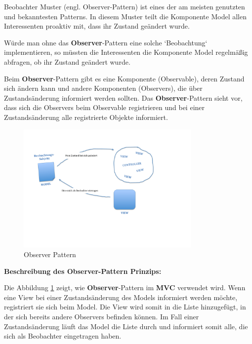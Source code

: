 Beobachter Muster (engl. Observer-Pattern) ist eines der am meisten genutzten und bekanntesten Patterns. In diesem Muster teilt die Komponente Model allen Interessenten proaktiv mit, dass ihr Zustand geändert wurde.

Würde man ohne das \textbf{Observer}-Pattern eine solche `Beobachtung` implementieren, so müssten die Interessenten die Komponente Model regelmäßig abfragen, ob ihr Zustand geändert wurde.

Beim \textbf{Observer}-Pattern gibt es eine Komponente (Observable), deren Zustand sich ändern kann und andere Komponenten (Observers), die über Zustandsänderung informiert werden sollten. Das \textbf{Observer}-Pattern sieht vor, dass sich die Observers beim Observable registrieren und bei einer Zustandsänderung alle registrierte Objekte informiert.

\begin{figure}[H]
\centering
\includegraphics[trim = 0mm 0mm 0mm 0mm, clip, width=0.8\textwidth]{resources/observer}
\caption[Observer Pattern]{Observer Pattern}
\label{img:observer}
\end{figure}

\textbf{Beschreibung des \textbf{Observer}-Pattern Prinzips:}

Die Abbildung \ref{img:observer} zeigt, wie \textbf{Observer}-Pattern im \textbf{MVC} verwendet wird. Wenn eine View bei einer Zustandsänderung des Models informiert werden möchte, registriert sie sich beim Model. Die View wird somit in die Liste hinzugefügt, in der sich bereits andere Observers befinden können. Im Fall einer Zustandsänderung läuft das Model die Liste durch und informiert somit alle, die sich als Beobachter eingetragen haben.


